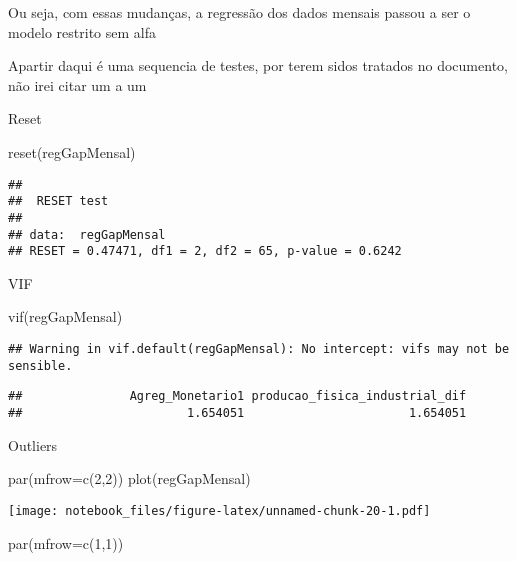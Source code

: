 \documentclass[
]{article}
\newenvironment{Shaded}{\begin{snugshade}}{\end{snugshade}}
\newcommand{\AttributeTok}[1]{\textcolor[rgb]{0.77,0.63,0.00}{#1}}
\newcommand{\DecValTok}[1]{\textcolor[rgb]{0.00,0.00,0.81}{#1}}
\newcommand{\FunctionTok}[1]{\textcolor[rgb]{0.00,0.00,0.00}{#1}}
\newcommand{\NormalTok}[1]{#1}
\begin{document}
Ou seja, com essas mudanças, a regressão dos dados mensais passou a ser
o modelo restrito sem alfa

Apartir daqui é uma sequencia de testes, por terem sidos tratados no
documento, não irei citar um a um

Reset

\begin{Shaded}
\begin{Highlighting}[]
\FunctionTok{reset}\NormalTok{(regGapMensal)}
\end{Highlighting}
\end{Shaded}

\begin{verbatim}
## 
##  RESET test
## 
## data:  regGapMensal
## RESET = 0.47471, df1 = 2, df2 = 65, p-value = 0.6242
\end{verbatim}

VIF

\begin{Shaded}
\begin{Highlighting}[]
\FunctionTok{vif}\NormalTok{(regGapMensal)}
\end{Highlighting}
\end{Shaded}

\begin{verbatim}
## Warning in vif.default(regGapMensal): No intercept: vifs may not be sensible.
\end{verbatim}

\begin{verbatim}
##               Agreg_Monetario1 producao_fisica_industrial_dif 
##                       1.654051                       1.654051
\end{verbatim}

Outliers

\begin{Shaded}
\begin{Highlighting}[]
\FunctionTok{par}\NormalTok{(}\AttributeTok{mfrow=}\FunctionTok{c}\NormalTok{(}\DecValTok{2}\NormalTok{,}\DecValTok{2}\NormalTok{))}
\FunctionTok{plot}\NormalTok{(regGapMensal)}
\end{Highlighting}
\end{Shaded}

\texttt{[image: notebook\_files/figure-latex/unnamed-chunk-20-1.pdf]}

\begin{Shaded}
\begin{Highlighting}[]
\FunctionTok{par}\NormalTok{(}\AttributeTok{mfrow=}\FunctionTok{c}\NormalTok{(}\DecValTok{1}\NormalTok{,}\DecValTok{1}\NormalTok{))}
\end{Highlighting}
\end{Shaded}
\end{document}
